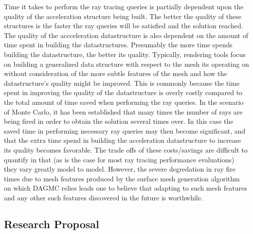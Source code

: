 \documentclass[10pt, a4paper]{article}
\begin{document}
Time it takes to perform the ray tracing queries is partially dependent upon the quality of the acceleration structure being built. The better the quality of these structures is the faster the ray queries will be satisfied and the solution reached. The quality of the accceleration datastructure is also dependent on the amount of time spent in building the datastructures. Presumably the more time spends building the datastructure, the better its quality. Typically, rendering tools focus on building a generalized data structure with respect to the mesh its operating on without consideration of the more subtle features of the mesh and how the datastructure's quality might be improved. This is commonly because the time spent in improving the quality of the datastructure is overly costly compared to the total amount of time saved when performing the ray queries. In the scenario of Monte Carlo, it has been established that many times the number of rays are being fired in order to obtain the solution several times over. In this case the saved time in performing necessary ray queries may then become significant, and that the extra time spend in building the acceleration datastructure to increase its quality becomes favorable. The trade offs of these costs/savings are difficult to quantify in that (as is the case for most ray tracing performance evaluations) they vary greatly model to model. However, the severe degredation in ray fire times due to mesh features produced by the surface mesh generation algorithm on which DAGMC relies leads one to believe that adapting to such mesh features and any other such features discovered in the future is worthwhile.

\subsection{Research Proposal}%
\end{document}
